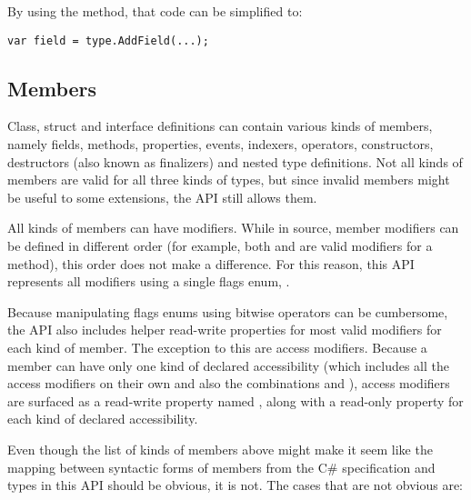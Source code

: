 By using the  method, that code can be simplified to:

\begin{verbatim}
var field = type.AddField(...);
\end{verbatim}

\subsection{Members}

Class, struct and interface definitions can contain various kinds of members, namely fields, methods, properties, events, indexers, operators, constructors, destructors (also known as finalizers) and nested type definitions. Not all kinds of members are valid for all three kinds of types, but since invalid members might be useful to some extensions, the \ac{API} still allows them.

All kinds of members can have modifiers. While in source, member modifiers can be defined in different order (for example, both  and  are valid modifiers for a method), this order does not make a difference. For this reason, this \ac{API} represents all modifiers using a single flags enum, . 

Because manipulating flags enums using bitwise operators can be cumbersome, the \ac{API} also includes helper read-write properties for most valid modifiers for each kind of member. The exception to this are access modifiers. Because a member can have only one kind of declared accessibility (which includes all the access modifiers on their own and also the combinations  and ), access modifiers are surfaced as a read-write property named , along with a read-only property for each kind of declared accessibility.

\medskip

Even though the list of kinds of members above might make it seem like the mapping between syntactic forms of members from the C\# specification and types in this \ac{API} should be obvious, it is not. The cases that are not obvious are:

